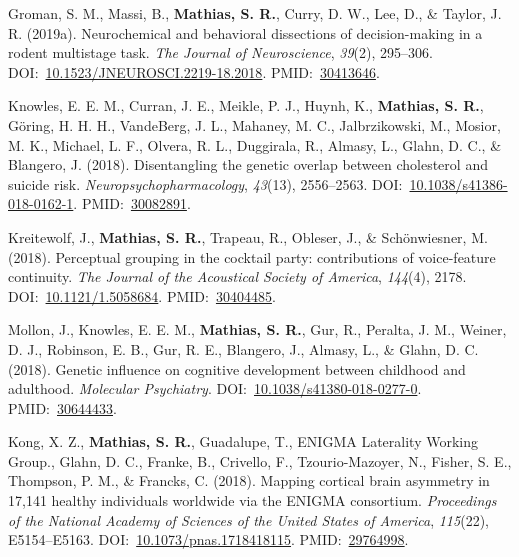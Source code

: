 \documentclass[10pt]{article}
\makeatletter
\newlength{\bibhang}
\newlength{\bibsep}
 {\@listi \global\bibsep\itemsep \global\advance\bibsep by\parsep}
\newenvironment{bibsection}%
        {\vspace{-\baselineskip}\begin{list}{}{%
       \setlength{\leftmargin}{\bibhang}%
       \setlength{\itemindent}{-\leftmargin}%
       \setlength{\itemsep}{\bibsep}%
       \setlength{\parsep}{\z@}%
        \setlength{\partopsep}{0pt}%
        \setlength{\topsep}{0pt}}}
        {\end{list}\vspace{-.6\baselineskip}}
\makeatother
\begin{document}
\begin{bibsection}
\item Groman, S. M., Massi, B., \textbf{Mathias, S. R.}, Curry, D. W., Lee, D., \& Taylor, J. R. (2019a). Neurochemical and behavioral dissections of decision-making in a rodent multistage task. \emph{The Journal of Neuroscience}, \emph{39}(2), 295--306. DOI:~\href{https://doi.org/10.1523/JNEUROSCI.2219-18.2018}{10.1523/JNEUROSCI.2219-18.2018}. PMID:~\href{https://www.ncbi.nlm.nih.gov/pubmed/?term=30413646}{30413646}.
\item Knowles, E. E. M., Curran, J. E., Meikle, P. J., Huynh, K., \textbf{Mathias, S. R.}, Göring, H. H. H., VandeBerg, J. L., Mahaney, M. C., Jalbrzikowski, M., Mosior, M. K., Michael, L. F., Olvera, R. L., Duggirala, R., Almasy, L., Glahn, D. C., \& Blangero, J. (2018). Disentangling the genetic overlap between cholesterol and suicide risk. \emph{Neuropsychopharmacology}, \emph{43}(13), 2556--2563. DOI:~\href{https://doi.org/10.1038/s41386-018-0162-1}{10.1038/s41386-018-0162-1}. PMID:~\href{https://www.ncbi.nlm.nih.gov/pubmed/?term=30082891}{30082891}.
\item Kreitewolf, J., \textbf{Mathias, S. R.}, Trapeau, R., Obleser, J., \& Schönwiesner, M. (2018). Perceptual grouping in the cocktail party: contributions of voice-feature continuity. \emph{The Journal of the Acoustical Society of America}, \emph{144}(4), 2178. DOI:~\href{https://doi.org/10.1121/1.5058684}{10.1121/1.5058684}. PMID:~\href{https://www.ncbi.nlm.nih.gov/pubmed/?term=30404485}{30404485}.
\item Mollon, J., Knowles, E. E. M., \textbf{Mathias, S. R.}, Gur, R., Peralta, J. M., Weiner, D. J., Robinson, E. B., Gur, R. E., Blangero, J., Almasy, L., \& Glahn, D. C. (2018). Genetic influence on cognitive development between childhood and adulthood. \emph{Molecular Psychiatry}. DOI:~\href{https://doi.org/10.1038/s41380-018-0277-0}{10.1038/s41380-018-0277-0}. PMID:~\href{https://www.ncbi.nlm.nih.gov/pubmed/?term=30644433}{30644433}.
\item Kong, X. Z., \textbf{Mathias, S. R.}, Guadalupe, T., ENIGMA Laterality Working Group., Glahn, D. C., Franke, B., Crivello, F., Tzourio-Mazoyer, N., Fisher, S. E., Thompson, P. M., \& Francks, C. (2018). Mapping cortical brain asymmetry in 17,141 healthy individuals worldwide via the ENIGMA consortium. \emph{Proceedings of the National Academy of Sciences of the United States of America}, \emph{115}(22), E5154--E5163. DOI:~\href{https://doi.org/10.1073/pnas.1718418115}{10.1073/pnas.1718418115}. PMID:~\href{https://www.ncbi.nlm.nih.gov/pubmed/?term=29764998}{29764998}.

\end{bibsection}
\end{document}
